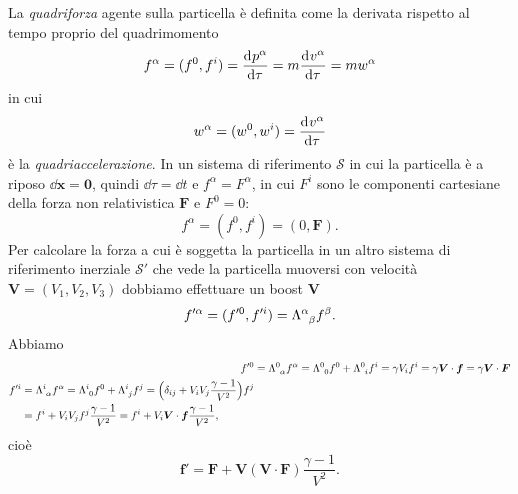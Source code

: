 La \emph{quadriforza} agente sulla particella è definita come
la derivata rispetto al tempo proprio del quadrimomento
\begin{equation}
  f^{\alpha} = (f^{0},f^{i}) =\frac{{\mathop{}\!\mathrm{d}^{}}p^{\alpha}}{\mathop{}\!\mathrm{d} {\tau}^{}} =
  m\frac{{\mathop{}\!\mathrm{d}^{}}v^{\alpha}}{\mathop{}\!\mathrm{d} {\tau}^{}} = mw^{\alpha}
\end{equation}
in cui
\begin{equation}
  w^{\alpha} = (w^{0},w^{i}) =\frac{{\mathop{}\!\mathrm{d}^{}}v^{\alpha}}{\mathop{}\!\mathrm{d} {\tau}^{}}
\end{equation}
è la \emph{quadriaccelerazione}.  In un sistema di
riferimento $\mathcal{S}$ in cui la particella è a riposo $\dd \bm{x} = \bm{0}$,
quindi $\dd \tau = \dd t$ e $f^{\alpha} = F^{\alpha}$, in cui $F^{i}$ sono le
componenti cartesiane della forza non relativistica $\bm{F}$ e $F^{0} = 0$:
\begin{equation}
  f^{\alpha} = (f^{0}, f^{i}) = (0, \bm{F}).
\end{equation}
Per calcolare la forza a cui è soggetta la particella in un altro sistema di
riferimento inerziale $\mathcal{S}'$ che vede la particella muoversi con
velocità $\bm{V} = (V_{1}, V_{2}, V_{3})$ dobbiamo effettuare un boost $\bm{V}$
\begin{equation}
  f'^{\alpha} = (f'^{0}, f'^{i}) = \tensor{\Lambda}{^{\alpha}_{\beta}}f^{\beta}.
\end{equation}
Abbiamo
\begin{subequations}
  \begin{align}
    f'^{0} &= \tensor{\Lambda}{^{0}_{\alpha}}f^{\alpha} =
    \tensor{\Lambda}{^{0}_{0}}f^{0} + \tensor{\Lambda}{^{0}_{i}}f^{i} = \gamma
    V_{i}f^{i} = \gamma \bm{V} \cdot \bm{f} = \gamma \bm{V} \cdot \bm{F} \\
    \begin{split}
      f'^{i} &= \tensor{\Lambda}{^{i}_{\alpha}}f^{\alpha} =
      \tensor{\Lambda}{^{i}_{0}}f^{0} + \tensor{\Lambda}{^{i}_{j}}f^{j}
      = \Big( \delta_{ij} + V_{i}V_{j}\frac{\gamma - 1}{V^{2}} \Big)f^{j} \\
      &= f^{i} + V_{i}V_{j}f^{j}\frac{\gamma - 1}{V^{2}} = f^{i} + V_{i} \bm{V}
      \cdot \bm{f} \frac{\gamma - 1}{V^{2}},
    \end{split}
  \end{align}
\end{subequations}
cioè
\begin{equation}
  \bm{f}' = \bm{F} + \bm{V}(\bm{V}\cdot\bm{F})\frac{\gamma - 1}{V^{2}}.
\end{equation}


